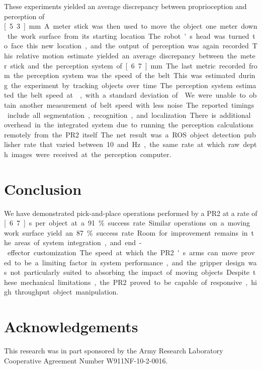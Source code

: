 \documentclass[letterpaper, 10 pt, conference]{ieeeconf}  %
\begin{document}
These experiments yielded an average discrepancy between
proprioception and perception of \unit[5.3]{mm}. A meter stick was
then used to move the object one meter down the work surface from its
starting location. The robot's head was turned to face this new
location, and the output of perception was again recorded. This
relative motion estimate yielded an average discrepancy between the
meter stick and the perception system of \unit[6.7]{mm}.

The last metric recorded from the perception system was the speed of
the belt. This was estimated during the experiment by tracking objects
over time. The perception system estimated the belt speed at
, with a standard deviation of
. We were unable to obtain another
measurement of belt speed with less noise.

The reported timings include all segmentation, recognition, and
localization. There is additional overhead in the integrated system
due to running the perception calculations remotely from the PR2
itself. The net result was a ROS object detection publisher rate that
varied between 10 and \unit[12]{Hz}, the same rate at which raw depth
images were received at the perception computer.

\section{Conclusion}
We have demonstrated pick-and-place operations performed by a PR2 at a
rate of \unit[6.7]{s} per object at a 91\% success rate. Similar
operations on a moving work surface yield an 87\% success rate. Room
for improvement remains in the areas of system integration, and
end-effector customization. The speed at which the PR2's arms can move
proved to be a limiting factor in system performance, and the gripper
design was not particularly suited to absorbing the impact of moving
objects. Despite these mechanical limitations, the PR2 proved to be
capable of responsive, high throughput object manipulation.

\section{Acknowledgements}
This research was in part sponsored by the Army Research
Laboratory Cooperative Agreement Number W911NF-10-2-0016.




\end{document}
